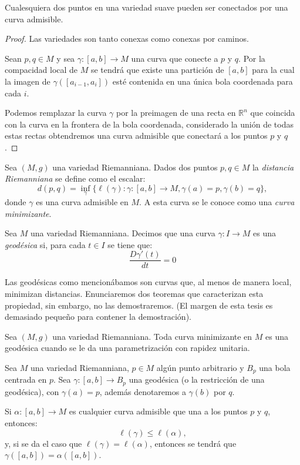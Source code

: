 \begin{lemma}
	Cualesquiera dos puntos en una variedad suave pueden ser conectados por una curva admisible.
\end{lemma}

\begin{proof}
	Las variedades son tanto conexas como conexas por caminos. 

	Sean $p, q \in M$ y sea $\gamma: [a,b] \to M$ una curva que conecte a $p$ y $q$. Por la compacidad local de $M$ se tendrá que existe una partición de $[a,b]$ para la cual la imagen de $\gamma([a_{i-1}, a_i])$ esté contenida en una única bola coordenada para cada $i$.

	Podemos remplazar la curva $\gamma$ por la preimagen de una recta en $\mathbb{R}^{n}$ que coincida con la curva en la frontera de la bola coordenada, considerado la unión de todas estas rectas obtendremos una curva admisible que conectará a los puntos $p$ y $q$.
\end{proof}

\begin{definition}
	Sea $(M,g)$ una variedad Riemanniana. Dados dos puntos $p,q \in M$ la \textit{distancia Riemanniana} se define como el escalar:
	\[
		d(p,q) = \inf_{\gamma} \{\ell(\gamma): \gamma: [a,b] \to M, \gamma(a) = p, \gamma(b) = q\},
	\]
	donde $\gamma$ es una curva admisible en $M$. A esta curva se le conoce como una \textit{curva minimizante}.
\end{definition}

\begin{definition}[Geodésica]
	Sea $M$ una variedad Riemanniana. Decimos que una curva $\gamma: I \to M$ es una \textit{geodésica} si, para cada $t \in I$ se tiene que:
	\[
		\frac{D\gamma'(t)}{dt} = 0
	\]
\end{definition}
Las geodésicas como mencionábamos son curvas que, al menos de manera local, minimizan distancias. Enunciaremos dos teoremas que caracterizan esta propiedad, sin embargo, no las demostraremos. (El margen de esta tesis es demasiado pequeño para contener la demostración).

\begin{theorem}
	Sea $(M,g)$ una variedad Riemanniana. Toda curva minimizante en $M$ es una geodésica cuando se le da una parametrización con rapidez unitaria.
\end{theorem}

\begin{theorem}
	Sea $M$ una variedad Riemanniana, $p \in M$ algún punto arbitrario y $B_{p}$ una bola centrada en $p$. Sea $\gamma: [a,b] \to B_{p}$ una geodésica (o la restricción de una geodésica), con $\gamma(a) = p$, además denotaremos a $\gamma(b)$ por $q$.

	Si $\alpha: [a,b] \to M$ es cualquier curva admisible que una a los puntos $p$ y $q$, entonces:
	\[
		\ell(\gamma) \leq \ell(\alpha),
	\]
	y, si se da el caso que $\ell(\gamma) = \ell(\alpha)$, entonces se tendrá que $\gamma([a,b]) = \alpha([a,b])$.
\end{theorem}

